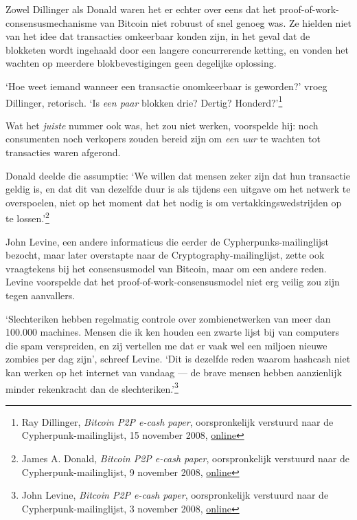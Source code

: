 \documentclass[
  a5paper,
  smalldemyvopaper,11pt,twoside,onecolumn,openright,extrafontsizes,
hidelinks]{memoir}
\begin{document}
Zowel Dillinger als Donald waren het er echter over eens dat het
proof-of-work-consensusmechanisme van Bitcoin niet robuust of snel
genoeg was. Ze hielden niet van het idee dat transacties omkeerbaar
konden zijn, in het geval dat de blokketen wordt ingehaald door een
langere concurrerende ketting, en vonden het wachten op meerdere
blokbevestigingen geen degelijke oplossing.

`Hoe weet iemand wanneer een transactie onomkeerbaar is geworden?' vroeg
Dillinger, retorisch. `Is \emph{een paar} blokken drie? Dertig?
Honderd?'\footnote{Ray Dillinger, \emph{Bitcoin P2P e-cash paper},
  oorspronkelijk verstuurd naar de Cypherpunk-mailinglijst, 15 november
  2008,
  \href{https://www.metzdowd.com/pipermail/cryptography/2008-November/014859.html}{online}}

Wat het \emph{juiste} nummer ook was, het zou niet werken, voorspelde
hij: noch consumenten noch verkopers zouden bereid zijn om \emph{een
uur} te wachten tot transacties waren afgerond.

Donald deelde die assumptie: `We willen dat mensen zeker zijn dat hun
transactie geldig is, en dat dit van dezelfde duur is als tijdens een
uitgave om het netwerk te overspoelen, niet op het moment dat het nodig
is om vertakkingswedstrijden op te lossen.'\footnote{James A. Donald,
  \emph{Bitcoin P2P e-cash paper}, oorspronkelijk verstuurd naar de
  Cypherpunk-mailinglijst, 9 november 2008,
  \href{https://www.metzdowd.com/pipermail/cryptography/2008-November/014841.html}{online}}

John Levine, een andere informaticus die eerder de
Cypherpunks-mailinglijst bezocht, maar later overstapte naar de
Cryptography-mailinglijst, zette ook vraagtekens bij het consensusmodel
van Bitcoin, maar om een andere reden. Levine voorspelde dat het
proof-of-work-consensusmodel niet erg veilig zou zijn tegen aanvallers.

`Slechteriken hebben regelmatig controle over zombienetwerken van meer
dan 100.000 machines. Mensen die ik ken houden een zwarte lijst bij van
computers die spam verspreiden, en zij vertellen me dat er vaak wel een
miljoen nieuwe zombies per dag zijn', schreef Levine. `Dit is dezelfde
reden waarom hashcash niet kan werken op het internet van vandaag --- de
brave mensen hebben aanzienlijk minder rekenkracht dan de
slechteriken.'\footnote{John Levine, \emph{Bitcoin P2P e-cash paper},
  oorspronkelijk verstuurd naar de Cypherpunk-mailinglijst, 3 november
  2008,
  \href{https://www.metzdowd.com/pipermail/cryptography/2008-November/014817.html}{online}}
\end{document}
